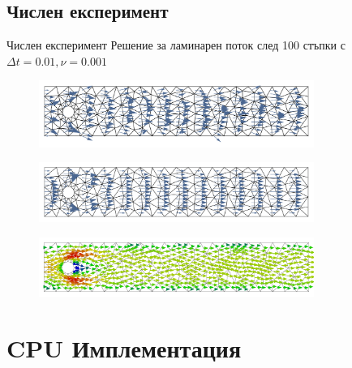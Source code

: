 \documentclass{beamer}
\begin{document}
\subsection{Числен експеримент}
	\begin{frame}{Числен експеримент}
	Решение за ламинарен поток след 100 стъпки с $\Delta t = 0.01, \nu=0.001$
	\begin{figure}[H]
\centering
\includegraphics[width=0.8\textwidth]{../../Figures/01_introduction/P1P0_100.pdf}
\end{figure}

\begin{figure}[H]
\centering
\includegraphics[width=0.8\textwidth]{../../Figures/01_introduction/P2P1_100.pdf}
\end{figure}

\begin{figure}[H]
\centering
\includegraphics[width=0.8\textwidth]{../../Figures/01_introduction/P2P1_adv_diff_100.pdf}
\end{figure}
	\end{frame}
	
\fi

\section{CPU Имплементация}
\end{document}
